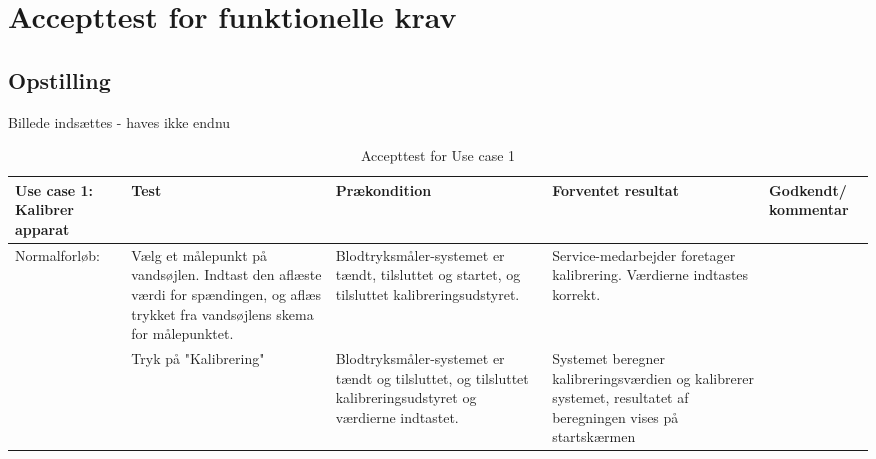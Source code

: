 \section{Accepttest for funktionelle krav}
\subsection{Opstilling}
Billede indsættes - haves ikke endnu
\\
\begin{table}[H]
\caption{Accepttest for Use case 1}\label{tab:tabel8}
\begin{tabular}{|>{\raggedright\arraybackslash}p{2.5cm}| >{\raggedright\arraybackslash}p{2.9cm} | >{\raggedright\arraybackslash}p{2.9cm} | >{\raggedright\arraybackslash}p{2.9cm} | >{\raggedright\arraybackslash}p{2.8cm} |}
   \hline
   \textbf{Use case 1: Kalibrer apparat} &\textbf{Test}& \textbf{Prækondition} & \textbf{Forventet resultat} & \textbf{Godkendt/ kommentar}\\ \hline
   Normalforløb: & Vælg et målepunkt på vandsøjlen. Indtast den aflæste værdi for spændingen, og aflæs trykket fra vandsøjlens skema for målepunktet. & Blodtryksmåler-systemet er tændt, tilsluttet og startet, og tilsluttet kalibreringsudstyret. & Service-medarbejder foretager kalibrering. Værdierne indtastes korrekt. & \\\hline
   & Tryk på "Kalibrering" & Blodtryksmåler-systemet er tændt og tilsluttet, og tilsluttet kalibreringsudstyret og værdierne indtastet. & Systemet beregner kalibreringsværdien og kalibrerer systemet, resultatet af beregningen vises på startskærmen & \\\hline
\end{tabular}
\end{table}


